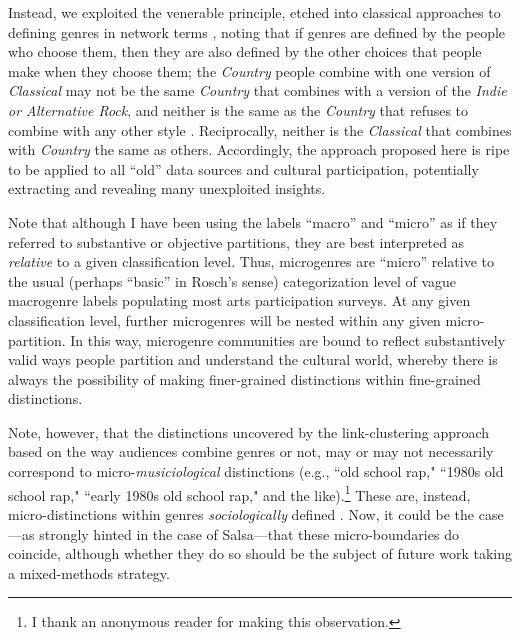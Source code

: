 \documentclass[a4paper,12pt]{article}
\begin{document}
Instead, we exploited the venerable principle, etched into classical approaches to defining genres in network terms \citep{dimaggio1987classification}, noting that if genres are defined by the people who choose them, then they are also defined by the other choices that people make when they choose them; the \textit{Country} people combine with one version of \textit{Classical} may not be the same \textit{Country} that combines with a version of the \textit{Indie or Alternative Rock}, and neither is the same as the \textit{Country} that refuses to combine with any other style \citep{lembo2017three}. Reciprocally, neither is the \textit{Classical} that combines with \textit{Country} the same as others. Accordingly, the approach proposed here is ripe to be applied to all ``old'' data sources and cultural participation, potentially extracting and revealing many unexploited insights. 

Note that although I have been using the labels ``macro'' and ``micro'' as if they referred to substantive or objective partitions, they are best interpreted as {\em relative} to a given classification level. Thus, microgenres are ``micro'' relative to the usual (perhaps ``basic'' in Rosch's \citeyearpar{Rosch1978-ue} sense) categorization level of vague macrogenre labels populating most arts participation surveys. At any given classification level, further microgenres will be nested within any given micro-partition. In this way, microgenre communities are bound to reflect substantively valid ways people partition and understand the cultural world, whereby there is always the possibility of making finer-grained distinctions within fine-grained distinctions. 

Note, however, that the distinctions uncovered by the link-clustering approach based on the way audiences combine genres or not, may or may not necessarily correspond to micro-\textit{musiciological} distinctions (e.g., ``old school rap," ``1980s old school rap," ``early 1980s old school rap," and the like).\footnote{I thank an anonymous reader for making this observation.} These are, instead, micro-distinctions within genres \textit{sociologically} defined \citep{lena2015relational}. Now, it could be the case---as strongly hinted in the case of Salsa---that these micro-boundaries do coincide, although whether they do so should be the subject of future work taking a mixed-methods strategy. 
\end{document}
